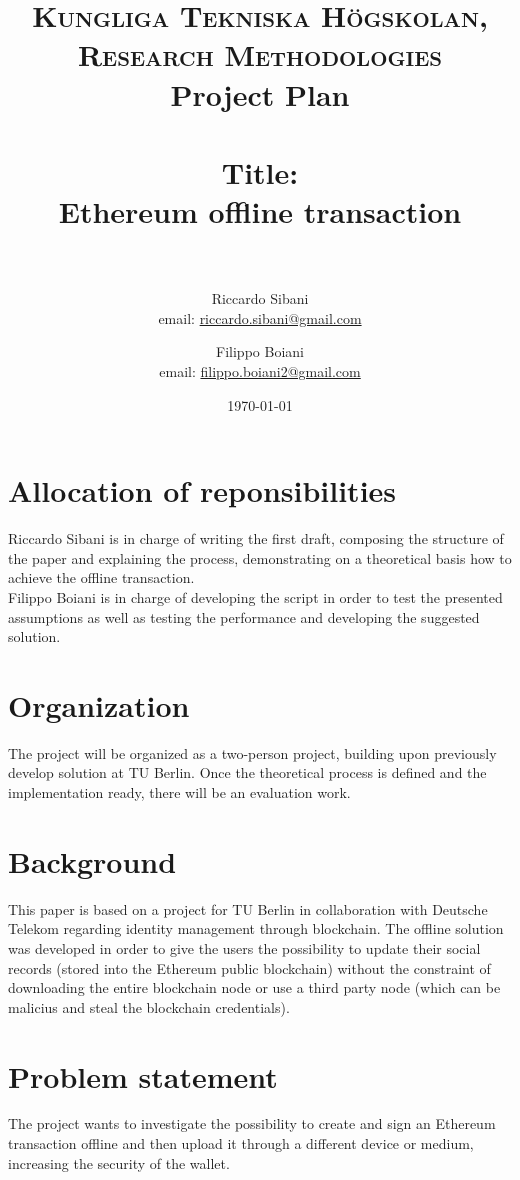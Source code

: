 \documentclass[paper=a4, fontsize=11pt]{scrartcl} %
\title{
\normalfont \normalsize
\textsc{Kungliga Tekniska Högskolan, Research Methodologies} \\ [10pt] %
Project Plan \\ [25pt]
\horrule{0.5pt} \\[0.4cm] %
\huge Title:\\Ethereum offline transaction \\ %
\vspace{5mm}
\horrule{2pt} \\[0.5cm] %
}
\author{Riccardo Sibani \\ email: \href{mailto:riccardo.sibani@gmail.com}{riccardo.sibani@gmail.com}
   \and Filippo Boiani \\ email: \href{mailto:filippo.boiani2@gmail.com}{filippo.boiani2@gmail.com} } %
\date{\normalsize\today} %
\numberwithin{equation}{section} %
\numberwithin{figure}{section} %
\numberwithin{table}{section} %
\begin{document}
\maketitle %


\section{Allocation of reponsibilities}
Riccardo Sibani is in charge of writing the first draft, composing the structure of the paper and explaining the process, demonstrating on a theoretical basis how to achieve the offline transaction. \\
Filippo Boiani is in charge of developing the script in order to test the presented assumptions as well as testing the performance and developing the suggested solution.

\section{Organization}
The project will be organized as a two-person project, building upon previously develop solution at TU Berlin. Once the theoretical process is defined and the implementation ready, there will be an evaluation work.

\section{Background}

This paper is based on a project for TU Berlin in collaboration with Deutsche Telekom regarding identity management through blockchain. The offline solution was developed in order to give the users the possibility to update their social records (stored into the Ethereum public blockchain) without the constraint of downloading the entire blockchain node or use a third party node (which can be malicius and steal the blockchain credentials).

\section{Problem statement}

The project wants to investigate the possibility to create and sign an Ethereum transaction offline and then upload it through a different device or medium, increasing the security of the wallet.
\end{document}
